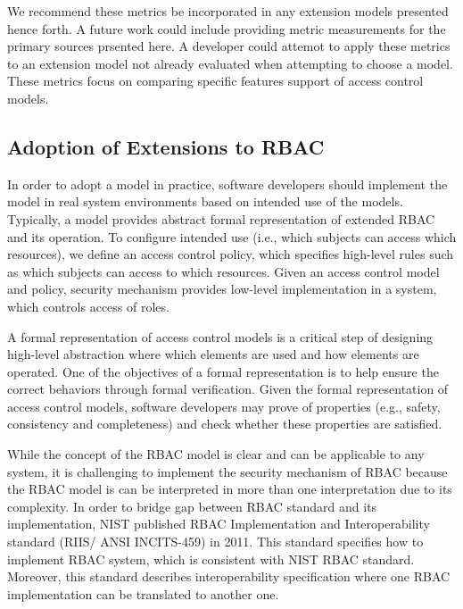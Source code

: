 We recommend these metrics be incorporated in any extension models presented hence forth. A future work could include providing metric measurements for the primary sources prsented here. 
A developer could attemot to apply these metrics to an extension model not already evaluated when attempting to choose a model. 
These metrics focus on comparing specific features support of access control models.


\subsection{Adoption of Extensions to RBAC}

In order to adopt a model in practice, software developers should implement the model in real system environments based on intended use of the models. Typically, a model provides abstract formal representation of extended RBAC and its operation. To configure intended use (i.e., which subjects can access which resources), we define an access control policy, which specifies high-level rules such as which subjects can access to which resources. Given an access control model and policy, security mechanism provides low-level implementation in a system, which controls access of roles.

A formal representation of access control models is a critical step of designing high-level abstraction where which elements are used and how elements are operated.
One of the objectives of a formal representation is to help ensure the correct behaviors through formal verification. Given the formal representation of access control models, software developers may prove of properties (e.g., safety, consistency and completeness) and check whether these properties are satisfied. 

While the concept of the RBAC model is clear and can be applicable to any system, it is challenging to implement the security mechanism of RBAC because the RBAC model is can be interpreted in more than one interpretation due to its complexity. In order to bridge gap between RBAC standard and its implementation, NIST published RBAC Implementation and Interoperability standard (RIIS/ ANSI INCITS-459) in 2011. This standard specifies how to implement RBAC system, which is consistent with NIST RBAC standard. Moreover, this standard describes interoperability specification where one RBAC implementation can be translated to another one.

